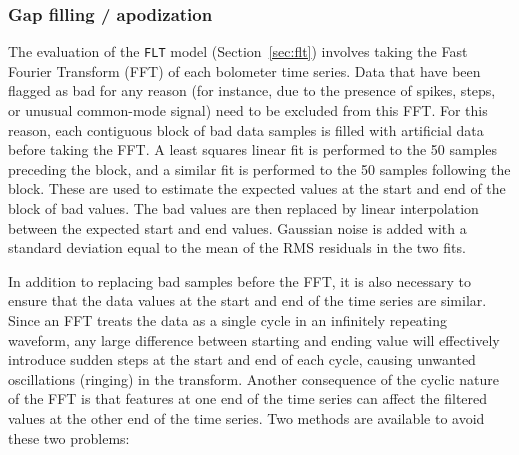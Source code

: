 \documentclass[useAMS,usenatbib,nofootinbib]{mn2e}
\newcommand{\model}[1]{\texttt{#1}}
\begin{document}
\subsubsection{Gap filling / apodization}
\label{sec:gaps}

The evaluation of the \model{FLT} model (Section~\ref{sec:flt}) involves
taking the Fast Fourier Transform (FFT) of each bolometer time series.
Data that have been flagged as bad for any reason (for instance, due to
the presence of spikes, steps, or unusual common-mode signal) need to be
excluded from this FFT. For this reason, each contiguous block of bad
data samples is filled with artificial data before taking the FFT. A
least squares linear fit is performed to the 50 samples preceding the
block, and a similar fit is performed to the 50 samples following the
block. These are used to estimate the expected values at the start and
end of the block of bad values. The bad values are then replaced by
linear interpolation between the expected start and end values. Gaussian
noise is added with a standard deviation equal to the mean of the RMS
residuals in the two fits.

In addition to replacing bad samples before the FFT, it is also
necessary to ensure that the data values at the start and end of the
time series are similar. Since an FFT treats the data as a single
cycle in an infinitely repeating waveform, any large difference
between starting and ending value will effectively introduce sudden
steps at the start and end of each cycle, causing unwanted
oscillations (ringing) in the transform. Another consequence of the
cyclic nature of the FFT is that features at one end of the time
series can affect the filtered values at the other end of the time
series. Two methods are available to avoid these two problems:
\end{document}

